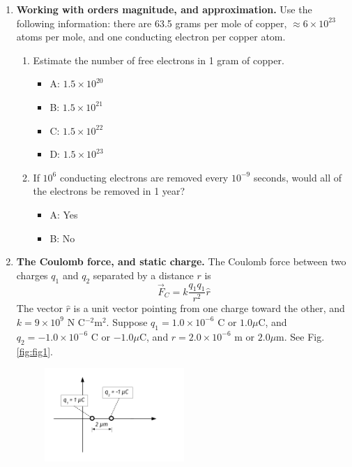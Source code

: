 \documentclass[10pt]{article}
\begin{document}
\maketitle

\begin{enumerate}
\item \textbf{Working with orders magnitude, and approximation.} Use the following information: there are 63.5 grams per mole of copper, $\approx 6 \times 10^{23}$ atoms per mole, and one conducting electron per copper atom. 
\begin{enumerate}
\item Estimate the number of free electrons in 1 gram of copper.
\begin{itemize}
\item A: $1.5 \times 10^{20}$
\item B: $1.5 \times 10^{21}$
\item C: $1.5 \times 10^{22}$
\item D: $1.5 \times 10^{23}$
\end{itemize}
\item If $10^6$ conducting electrons are removed every $10^{-9}$ seconds, would all of the electrons be removed in 1 year?
\begin{itemize}
\item A: Yes
\item B: No
\end{itemize}
\end{enumerate}
\item \textbf{The Coulomb force, and static charge.} The Coulomb force between two charges $q_1$ and $q_2$ separated by a distance $r$ is 
\begin{equation}
 	\vec{F}_C = k\frac{q_1 q_1}{r^2}\hat{r}
\end{equation}
The vector $\hat{r}$ is a unit vector pointing from one charge toward the other, and $k = 9\times 10^9$ N C$^{-2}$m$^{2}$.  Suppose $q_1 = 1.0\times 10^{-6}$ C or $1.0 \mu$C, and $q_2 = -1.0\times 10^{-6}$ C or $-1.0 \mu$C, and $r=2.0 \times 10^{-6}$ m or $2.0 \mu$m.  See Fig. \ref{fig:fig1}.
\begin{figure}[hb]
\centering
\includegraphics[width=0.5\textwidth]{midtermDiagram1.pdf}

\end{figure}
\end{enumerate}
\end{document}
